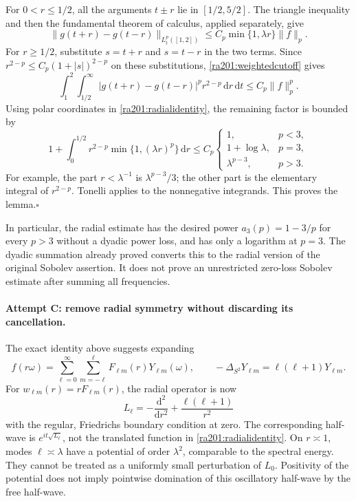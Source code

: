 \documentclass[11pt]{article}
\newcommand{\dd}{\,\mathrm d}
\begin{document}
	For $0<r\leq1/2$, all the arguments $t\pm r$ lie in $[1/2,5/2]$.
	The triangle inequality and then the fundamental theorem of calculus,
	applied separately, give
	\[
	\|g(t+r)-g(t-r)\|_{L^p_t([1,2])}
	\leq C_p\min\{1,\lambda r\}\|f\|_p.
	\]
	For $r\geq1/2$, substitute $s=t+r$ and $s=t-r$ in the two terms.
	Since $r^{2-p}\leq C_p(1+|s|)^{2-p}$ on these substitutions,
	\eqref{ra201:weightedcutoff} gives
	\[
	\int_1^2\int_{1/2}^{\infty}
	|g(t+r)-g(t-r)|^p r^{2-p}\dd r\dd t
	\leq C_p\|f\|_p^p.
	\]
	Using polar coordinates in \eqref{ra201:radialidentity}, the remaining
	factor is bounded by
	\begin{equation}\label{ra201:radialintegral}
		1+\int_0^{1/2}r^{2-p}\min\{1,(\lambda r)^p\}\dd r
		\leq C_p
		\begin{cases}
			1,&p<3,\\
			1+\log\lambda,&p=3,\\
			\lambda^{p-3},&p>3.
		\end{cases}
	\end{equation}
	For example, the part $r<\lambda^{-1}$ is
	$\lambda^{p-3}/3$; the other part is the elementary integral of
	$r^{2-p}$. Tonelli applies to the nonnegative integrands. This proves
	the lemma.\hfill$\square$
	
	In particular, the radial estimate has the desired power
	$a_3(p)=1-3/p$ for every $p>3$ without a dyadic power loss, and has only
	a logarithm at $p=3$. The dyadic summation already proved converts this
	to the radial version of the original Sobolev assertion. It does not
	prove an unrestricted zero-loss Sobolev estimate after summing all
	frequencies.
	
	\paragraph{Attempt C: remove radial symmetry without discarding its cancellation.}
	The exact identity above suggests expanding
	\[
	f(r\omega)=\sum_{\ell=0}^{\infty}\sum_{m=-\ell}^{\ell}
	F_{\ell m}(r)Y_{\ell m}(\omega),
	\qquad -\Delta_{S^2}Y_{\ell m}=\ell(\ell+1)Y_{\ell m}.
	\]
	For $w_{\ell m}(r)=rF_{\ell m}(r)$, the radial operator is now
	\begin{equation}\label{ra201:angularbarrier}
		L_\ell=-\frac{\mathrm d^2}{\mathrm dr^2}
		+\frac{\ell(\ell+1)}{r^2}
	\end{equation}
	with the regular, Friedrichs boundary condition at zero. The corresponding
	half-wave is $e^{it\sqrt{L_\ell}}$, not the translated function in
	\eqref{ra201:radialidentity}. On $r\asymp1$, modes $\ell\asymp\lambda$
	have a potential of order $\lambda^2$, comparable to the spectral energy.
	They cannot be treated as a uniformly small perturbation of $L_0$.
	Positivity of the potential does not imply pointwise domination of this
	oscillatory half-wave by the free half-wave.
	
\end{document}
